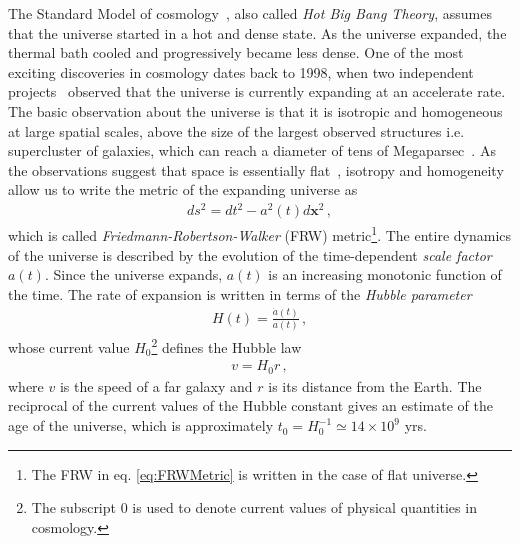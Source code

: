 \documentclass[12pt,a4paper]{book}
\begin{document}
The Standard Model of cosmology~\cite{Gorbunov:2011zz}, also called \textit{Hot Big Bang Theory}, assumes that the universe started in a hot and dense state. As the universe expanded, the thermal bath cooled and progressively became less dense. One of the most exciting discoveries in cosmology dates back to 1998, when two independent projects~\cite{Riess:1998cb, Perlmutter:1998np} observed that the universe is currently expanding at an accelerate rate. The basic observation about the universe is that it is isotropic and homogeneous at large spatial scales, above the size of the largest observed structures i.e. supercluster of galaxies, which can reach a diameter of tens of Megaparsec~\cite{Galaxies}. As the observations suggest that space is essentially flat~\cite{Ade:2013zuv}, isotropy and homogeneity allow us to write the metric of the expanding universe as
\begin{align}
\label{eq:FRWMetric}
ds^2 = dt^2 - a^2(t) d \mathbf{x}^2 \,,
\end{align}
which is called \textit{Friedmann-Robertson-Walker} (FRW) metric\footnote{The FRW in eq. \eqref{eq:FRWMetric} is written in the case of flat universe.}. The entire dynamics of the universe is described by the evolution of the time-dependent \textit{scale factor} $a(t)$. Since the universe expands, $a(t)$ is an increasing monotonic function of the time. The rate of expansion is written in terms of the \textit{Hubble parameter}
\begin{align}
\label{eq:HubbleParameter}
H(t) = \frac{\dot{a}(t)}{a(t)} \,,
\end{align}
whose current value $H_0$\footnote{The subscript $0$ is used to denote current values of physical quantities in cosmology.} defines the Hubble law
\begin{align}
\label{eq:HubbleLaw}
v = H_0 r \,,
\end{align}
where $v$ is the speed of a far galaxy and $r$ is its distance from the Earth. The reciprocal of the current values of the Hubble constant gives an estimate of the age of the universe, which is approximately $t_0 = H_0^{-1} \simeq 14 \times 10^9$ yrs.\\
\end{document}
